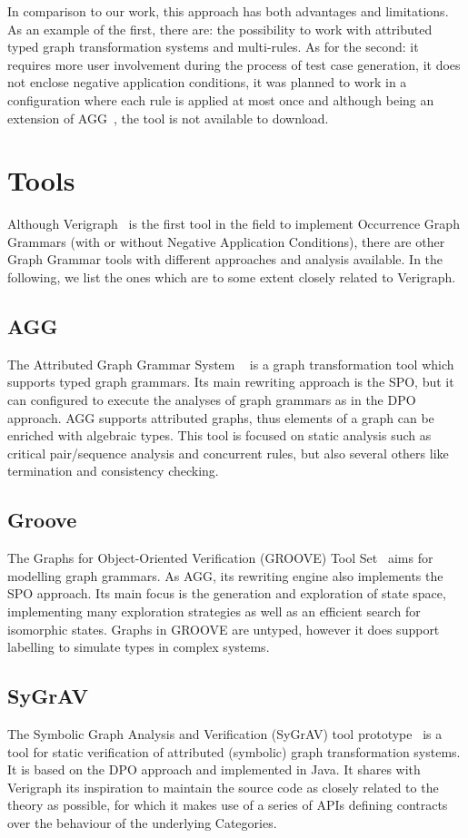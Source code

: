 In comparison to our work, this approach has both advantages and limitations. As an example of the first, there are: the possibility to work with attributed typed graph transformation systems and multi-rules. As for the second: it requires more user involvement during the process of test case generation, it does not enclose negative application conditions, it was planned to work in a configuration where each rule is applied at most once and although being an extension of
AGG~\cite{Taentzer2000}, the tool is not available to download.

\section{Tools}

Although Verigraph~\cite{Costa2016, verigraph, Azzi2018} is the first tool in the field to implement Occurrence Graph Grammars (with or without Negative Application Conditions), there are other Graph Grammar tools with different approaches and analysis available. In the following, we list the ones which are to some extent closely related to Verigraph.

\subsection{AGG}

  The Attributed Graph Grammar System ~\cite{Taentzer2000} is a graph transformation tool which supports typed graph grammars.
  Its main rewriting approach is the SPO, but it can configured to execute the analyses of graph grammars as in the DPO approach.
  AGG supports attributed graphs, thus elements of a graph can be enriched with algebraic types.
  This tool is focused on static analysis such as critical pair/sequence analysis and concurrent rules, but also several others like termination and consistency checking.

\subsection{Groove}The Graphs for Object-Oriented Verification (GROOVE) Tool Set~\cite{Rensink2004} aims for modelling graph grammars. As AGG, its rewriting engine also implements the SPO approach. Its main focus is the generation and exploration of state space, implementing many exploration strategies as well as an efficient search for isomorphic states. Graphs in GROOVE are untyped, however it does support labelling to simulate types in complex systems.


\subsection{SyGrAV}

The Symbolic Graph Analysis and Verification (SyGrAV) tool prototype~\cite{Deckwerth2016} is a tool for static verification of attributed (symbolic) graph transformation systems. It is based on the DPO approach and implemented in Java. It shares with Verigraph its inspiration to maintain the source code as closely related to the theory as possible, for which it makes use of a series of APIs defining contracts over the behaviour of the underlying Categories.
